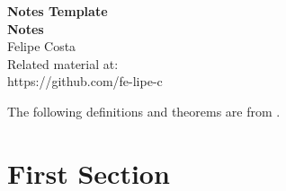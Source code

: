 \documentclass[12pt]{article}
\newcommand{\DOI}{https://github.com/fe-lipe-c}
\begin{document}
\begin{titlepage}
	\begin{flushright}
		\LARGE{\textbf{Notes Template}}\\
		\vfill
		\Huge{\textbf{Notes}}\\
		\vfill
		\large Felipe Costa\\
		\vfill
		\normalsize Related material at:\\
		\DOI
		\vfill
	\end{flushright}
\end{titlepage}

\begin{center}
	\tableofcontents
\end{center}

\pagebreak

The following definitions and theorems are from \cite{maschler_solan_zamir_2020}.


\section{First Section}


\printbibliography
% 
% 
\end{document}
